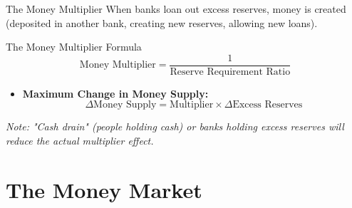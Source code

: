 \documentclass[aspectratio=169]{beamer}
\begin{document}
\begin{frame}{The Money Multiplier}
    When banks loan out excess reserves, money is created (deposited in another bank, creating new reserves, allowing new loans).

    \begin{block}{The Money Multiplier Formula}
        \[ \text{Money Multiplier} = \frac{1}{\text{Reserve Requirement Ratio}} \]
    \end{block}

    \begin{itemize}
        \item \textbf{Maximum Change in Money Supply:}
        \[ \Delta \text{Money Supply} = \text{Multiplier} \times \Delta \text{Excess Reserves} \]
    \end{itemize}
    
    \textit{Note: "Cash drain" (people holding cash) or banks holding excess reserves will reduce the actual multiplier effect.}
\end{frame}

\section{The Money Market}
\end{document}
